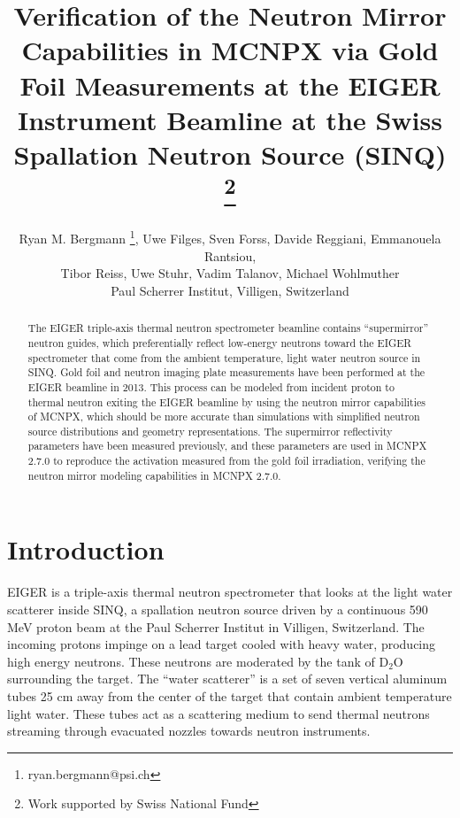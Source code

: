 \documentclass[a4paper,
              ]{jacow}
\begin{document}
\title{Verification of the Neutron Mirror Capabilities in MCNPX via Gold Foil Measurements at the EIGER Instrument Beamline at the Swiss Spallation Neutron Source (SINQ) \thanks{Work supported by Swiss National Fund}}

\author{Ryan M. Bergmann \thanks{ryan.bergmann@psi.ch}, Uwe Filges, Sven Forss, Davide Reggiani, Emmanouela Rantsiou, \\ Tibor Reiss, Uwe Stuhr, Vadim Talanov, Michael Wohlmuther \\ Paul Scherrer Institut, Villigen, Switzerland\\}

\maketitle

%
\begin{abstract}
   The EIGER triple-axis thermal neutron spectrometer beamline contains “supermirror” neutron guides, which preferentially reflect low-energy neutrons toward the EIGER spectrometer that come from the ambient temperature, light water neutron source in SINQ.  Gold foil and neutron imaging plate measurements have been performed at the EIGER beamline in 2013.  This process can be modeled from incident proton to thermal neutron exiting the EIGER beamline by using the neutron mirror capabilities of MCNPX, which should be more accurate than simulations with simplified neutron source distributions and geometry representations.  The supermirror reflectivity parameters have been measured previously, and these parameters are used in MCNPX 2.7.0 to reproduce the activation measured from the gold foil irradiation, verifying the neutron mirror modeling capabilities in MCNPX 2.7.0.
\end{abstract}


\section{Introduction}

EIGER is a triple-axis thermal neutron spectrometer that looks at the light water scatterer inside SINQ, a spallation neutron source driven by a continuous 590 MeV proton beam at the Paul Scherrer Institut in Villigen, Switzerland.  The incoming protons impinge on a lead target cooled with heavy water, producing high energy neutrons.  These neutrons are moderated by the tank of D$_2$O surrounding the target.  The ``water scatterer'' is a set of seven vertical aluminum tubes 25 cm away from the center of the target that contain ambient temperature light water.  These tubes act as a scattering medium to send thermal neutrons streaming through evacuated nozzles towards neutron instruments.  
\end{document}
